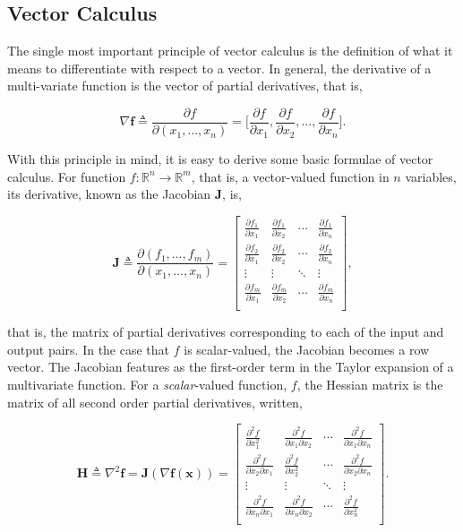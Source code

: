 \documentclass[11pt]{amsart}
\begin{document}
\subsection{Vector Calculus}

The single most important principle of vector calculus is the definition of what it means to differentiate with respect to a vector. In general, the derivative of a multi-variate function is the vector of partial derivatives, that is,

$$\nabla\mathbf{f} \triangleq \frac{\partial f}{\partial(x_1, \dots, x_n)} = \bigg[\frac{\partial f}{\partial x_{1}}, \frac{\partial f}{\partial x_{2}}, \dots, \frac{\partial f}{\partial x_{n}}\bigg].$$

With this principle in mind, it is easy to derive some basic formulae of vector calculus. For function $f : \mathbb{R}^{n} \to \mathbb{R}^{m}$, that is, a vector-valued function in $n$ variables, its derivative, known as the Jacobian $\mathbf{J}$, is,

$$\mathbf{J} \triangleq \frac{\partial (f_1, \dots, f_m)}{\partial(x_1, \dots, x_n)} = \begin{bmatrix}
\frac{\partial f_1}{\partial x_{1}}&\frac{\partial f_1}{\partial x_{2}}&\cdots&\frac{\partial f_1}{\partial x_{n}}\\
\frac{\partial f_2}{\partial x_{1}}&\frac{\partial f_2}{\partial x_{2}}&\cdots&\frac{\partial f_2}{\partial x_{n}}\\
\vdots & \vdots & \ddots & \vdots \\
\frac{\partial f_m}{\partial x_{1}}&\frac{\partial f_m}{\partial x_{2}}&\cdots&\frac{\partial f_m}{\partial x_{n}}\\
\end{bmatrix},$$

that is, the matrix of partial derivatives corresponding to each of the input and output pairs. In the case that $f$ is scalar-valued, the Jacobian becomes a row vector. The Jacobian features as the first-order term in the Taylor expansion of a multivariate function. For a \emph{scalar}-valued function, $f$, the Hessian matrix is the matrix of all second order partial derivatives, written,

$$\mathbf{H} \triangleq \nabla^2\mathbf{f} = \mathbf{J}(\nabla\mathbf{f}(\mathbf{x})) = \begin{bmatrix}
\frac{\partial^2 f}{\partial x_{1}^2}&\frac{\partial^2 f}{\partial x_{1}\partial x_{2}}&\cdots&\frac{\partial^2 f}{\partial x_{1}\partial x_{n}}\\
\frac{\partial^2 f}{\partial x_{2}\partial x_{1}}&\frac{\partial^2 f}{\partial x_{2}^2}&\cdots&\frac{\partial^2 f}{\partial x_{2}\partial x_{n}} \\
\vdots & \vdots & \ddots & \vdots \\
\frac{\partial^2 f}{\partial x_{n}\partial x_{1}}&\frac{\partial^2 f}{\partial x_{n}\partial x_{2}}&\cdots&\frac{\partial^2 f}{\partial x_{n}^2}\\
\end{bmatrix}.$$
\end{document}
